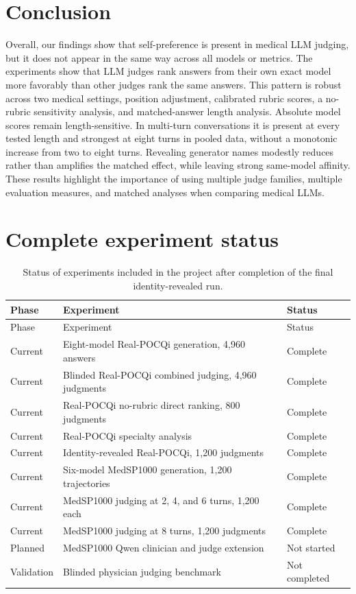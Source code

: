 \documentclass[11pt]{article}
\begin{document}
\section{Conclusion}

Overall, our findings show that self-preference is present in medical LLM
judging, but it does not appear in the same way across all models or metrics.
The experiments show that LLM judges rank answers from their own exact
model more favorably than other judges rank the same answers. This pattern is
robust across two medical settings, position adjustment, calibrated rubric
scores, a no-rubric sensitivity analysis, and matched-answer length analysis.
Absolute model scores remain length-sensitive. In multi-turn conversations it
is present at every tested length and strongest at eight turns in pooled data,
without a monotonic increase from two to eight turns. Revealing generator names
modestly reduces rather than amplifies the matched effect, while leaving strong
same-model affinity. These results highlight
the importance of using multiple judge families, multiple evaluation measures,
and matched analyses when comparing medical LLMs.

\clearpage
\appendix

\section{Complete experiment status}

\begin{longtable}{>{\raggedright\arraybackslash}p{}
                  >{\raggedright\arraybackslash}p{}
                  >{\raggedright\arraybackslash}p{}}
\caption{Status of experiments included in the project after completion of the
final identity-revealed run.}\label{tab:status}\\
\toprule
Phase & Experiment & Status \\
\midrule
\endfirsthead
\toprule
Phase & Experiment & Status \\
\midrule
\endhead
Current & Eight-model Real-POCQi generation, 4,960 answers & Complete \\
Current & Blinded Real-POCQi combined judging, 4,960 judgments & Complete \\
Current & Real-POCQi no-rubric direct ranking, 800 judgments & Complete \\
Current & Real-POCQi specialty analysis & Complete \\
Current & Identity-revealed Real-POCQi, 1,200 judgments & Complete \\
Current & Six-model MedSP1000 generation, 1,200 trajectories & Complete \\
Current & MedSP1000 judging at 2, 4, and 6 turns, 1,200 each & Complete \\
Current & MedSP1000 judging at 8 turns, 1,200 judgments & Complete \\
Planned & MedSP1000 Qwen clinician and judge extension & Not started \\
Validation & Blinded physician judging benchmark & Not completed \\
\bottomrule
\end{longtable}
\end{document}
